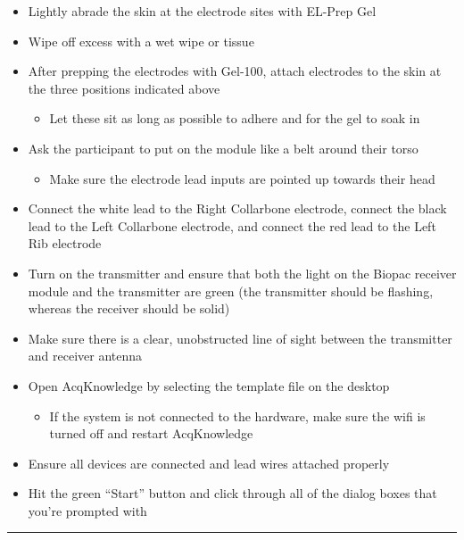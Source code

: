 \documentclass[]{book}
\providecommand{\tightlist}{%
  \setlength{\itemsep}{0pt}\setlength{\parskip}{0pt}}
\begin{document}
\begin{itemize}
\tightlist
\item
  Lightly abrade the skin at the electrode sites with EL-Prep Gel
\item
  Wipe off excess with a wet wipe or tissue
\item
  After prepping the electrodes with Gel-100, attach electrodes to the skin at the three positions indicated above

  \begin{itemize}
  \tightlist
  \item
    Let these sit as long as possible to adhere and for the gel to soak in
  \end{itemize}
\item
  Ask the participant to put on the module like a belt around their torso

  \begin{itemize}
  \tightlist
  \item
    Make sure the electrode lead inputs are pointed up towards their head
  \end{itemize}
\item
  Connect the white lead to the Right Collarbone electrode, connect the black lead to the Left Collarbone electrode, and connect the red lead to the Left Rib electrode
\item
  Turn on the transmitter and ensure that both the light on the Biopac receiver module and the transmitter are green (the transmitter should be flashing, whereas the receiver should be solid)
\item
  Make sure there is a clear, unobstructed line of sight between the transmitter and receiver antenna
\item
  Open AcqKnowledge by selecting the template file on the desktop

  \begin{itemize}
  \tightlist
  \item
    If the system is not connected to the hardware, make sure the wifi is turned off and restart AcqKnowledge
  \end{itemize}
\item
  Ensure all devices are connected and lead wires attached properly
\item
  Hit the green ``Start'' button and click through all of the dialog boxes that you're prompted with
\end{itemize}

\begin{center}\rule{0.5\linewidth}{0.5pt}\end{center}
\end{document}
